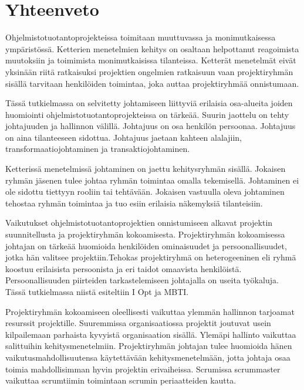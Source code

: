 \documentclass[finnish]{tktltiki2}
\theoremstyle{definition}
\theoremstyle{remark}
\begin{document}
  



\section{Yhteenveto}

Ohjelmistotuotantoprojekteissa toimitaan muuttuvassa ja monimutkaisessa ympäristössä. Ketterien menetelmien kehitys on osaltaan helpottanut reagoimista muutoksiin ja toimimista monimutkaisissa tilanteissa. Ketterät menetelmät eivät yksinään riitä ratkaisuksi projektien ongelmien ratkaisuun vaan projektiryhmän sisällä tarvitaan henkilöiden toimintaa, joka auttaa projektiryhmää onnistumaan.

Tässä tutkielmassa on selvitetty johtamiseen liittyviä erilaisia osa-alueita joiden huomiointi ohjelmistotuotantoprojekteissa on tärkeää. Suurin jaottelu on tehty johtajuuden ja hallinnon välillä. Johtajuus on osa henkilön persoonaa. Johtajuus on aina tilanteeseen sidottua. Johtajuus jaetaan kahteen alalajiin, transformaatiojohtaminen ja transaktiojohtaminen.

Ketterissä menetelmissä johtaminen on jaettu kehitysryhmän sisällä. Jokaisen ryhmän jäsenen tulee johtaa ryhmän toimintaa omalla tekemisellä. Johtaminen ei ole sidottu tiettyyn rooliin tai tehtävään. Jokaisen vastuulla oleva johtaminen tehostaa ryhmän toimintaa ja tuo esiin erilaisia näkemyksiä tilanteisiin.

Vaikutukset ohjelmistotuotantoprojektien onnistumiseen alkavat projektin suunnitellusta ja projektiryhmän kokoamisesta. Projektiryhmän kokoamisessa johtajan on tärkeää huomioida henkilöiden ominaisuudet ja persoonallisuudet, jotka hän valitsee projektiin.Tehokas projektiryhmä on heterogeeninen eli ryhmä koostuu erilaisista persoonista ja eri taidot omaavista henkilöistä. Persoonallisuuden piirteiden tarkastelemiseen johtajalla on useita työkaluja. Tässä tutkielmassa niistä esiteltiin I Opt ja MBTI.

Projektiryhmän kokoamiseen oleellisesti vaikuttaa ylemmän hallinnon tarjoamat resurssit projektille. Suuremmissa organisaatiossa projektit joutuvat usein kilpailemaan parhaista kyvyistä organisaation sisällä. Ylemäpi hallinto vaikuttaa salittuihin kehitysmenetelmiin. Projektiryhmän johtajan tulee huomioida hänen vaikutusmahdollisuutensa käytettävään kehitysmenetelmään, jotta johtaja osaa toimia mahdollisimman hyvin projektin erivaiheissa. Scrumissa scrummaster vaikuttaa scrumtiimin toimintaan scrumin periaatteiden kautta.
\end{document}
